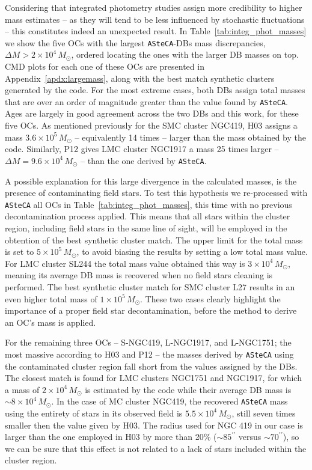 \documentclass[a4paper,fleqn,usenatbib]{mnras}
\begin{document}
Considering that integrated photometry studies assign more credibility to higher
mass estimates -- as they will tend to be less influenced by stochastic
fluctuations -- this constitutes indeed an unexpected result.
%
In Table~\ref{tab:integ_phot_masses} we show the five OCs with the largest
\texttt{ASteCA}-DBs mass discrepancies, $\Delta M{>}2{\times}10^4\,M_{\odot}$,
ordered locating the ones with the larger DB masses on top.
CMD plots for each one of these OCs are presented in
Appendix~\ref{apdx:largemass}, along with the best match synthetic clusters
generated by the code.
For the most extreme cases, both DBs assign total masses that are over an order
of magnitude greater than the value found by \texttt{ASteCA}.
Ages are largely in good agreement across the two DBs and this work, for these
five OCs.
As mentioned previously for the SMC cluster NGC419, H03 assigns a mass
$3.6{\times}10^5\,M_{\odot}$ -- equivalently 14 times -- larger than the mass
obtained by the code. Similarly, P12 gives LMC cluster NGC1917 a mass 25
times larger -- $\Delta M{=}9.6{\times}10^4\,M_{\odot}$ -- than the one derived by
\texttt{ASteCA}.

A possible explanation for this large divergence in the calculated masses, is
the presence of contaminating field stars.
To test this hypothesis we re-processed with \texttt{ASteCA} all OCs in
Table~\ref{tab:integ_phot_masses}, this time with no previous decontamination
process applied. This means that all stars within the cluster region, including
field stars in the same line of sight, will be employed in the obtention of 
the best synthetic cluster match. The upper limit for the total mass is set to
$5{\times}10^5\,M_{\odot}$, to avoid biasing the results by setting a low total
mass value.
%
For LMC cluster SL244 the total mass value obtained this way is
$3{\times}10^4\,M_{\odot}$, meaning its average DB mass is recovered when no
field stars cleaning is performed.
The best synthetic cluster match for SMC cluster L27 results in an even higher
total mass of $1{\times}10^5\,M_{\odot}$. These two cases clearly highlight the
importance of a proper field star decontamination, before the method to derive an
OC's mass is applied.

For the remaining three OCs -- S-NGC419, L-NGC1917, and L-NGC1751; the most
massive according to H03 and P12 -- the masses derived by \texttt{ASteCA} using
the contaminated cluster region fall short from the values assigned by the DBs.
The closest match is found for LMC clusters NGC1751 and NGC1917, for which a
mass of $2{\times}10^4\,M_{\odot}$ is estimated by the code while their average DB
mass is ${\sim}8{\times}10^4\,M_{\odot}$.
In the case of MC cluster NGC419, the recovered \texttt{ASteCA} mass using the
entirety of stars in its observed field is $5.5{\times}10^4\,M_{\odot}$, still
seven times smaller then the value given by H03. The radius used for NGC 419 in
our case is larger than the one employed in H03 by more than 20\%
(${\sim}85^{\prime\prime}$ versus ${\sim}70^{\prime\prime}$), so we can be sure
that this effect is not related to a lack of stars included within the cluster
region.
\end{document}
